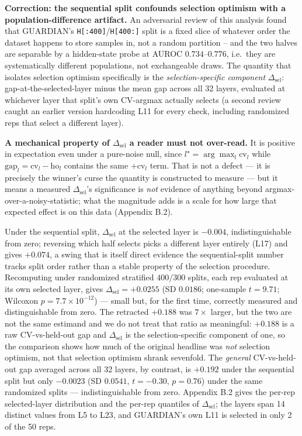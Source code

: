 \documentclass[10pt]{article} %
\begin{document}
\textbf{Correction: the sequential split confounds selection optimism with
a population-difference artifact.} An adversarial review of this analysis
found that GUARDIAN's \texttt{H[:400]}/\texttt{H[400:]} split is a fixed
slice of whatever order the dataset happens to store samples in, not a
random partition -- and the two halves are separable by a hidden-state
probe at AUROC $0.734$--$0.776$, i.e.\ they are systematically different
populations, not exchangeable draws. The quantity that isolates selection
optimism specifically is the \emph{selection-specific component}
$\Delta_{\text{sel}}$: gap-at-the-selected-layer minus the mean gap across all
32 layers, evaluated at whichever layer that split's own CV-argmax actually
selects (a second review caught an earlier version hardcoding L11 for every
check, including randomized reps that select a different layer).

\textbf{A mechanical property of $\Delta_{\text{sel}}$ a reader must not
over-read.} It is positive in expectation even under a pure-noise null, since
$l^\star=\arg\max_l\text{cv}_l$ while $\text{gap}_l=\text{cv}_l-\text{ho}_l$
contains the same $+\text{cv}_l$ term. That is not a defect --- it is precisely
the winner's curse the quantity is constructed to measure --- but it means a
measured $\Delta_{\text{sel}}$'s significance is \emph{not} evidence of
anything beyond argmax-over-a-noisy-statistic; what the magnitude adds is a
scale for how large that expected effect is on this data (Appendix B.2).

Under the sequential split, $\Delta_{\text{sel}}$ at the selected layer is
$-0.004$, indistinguishable from zero; reversing which half selects picks a
different layer entirely (L17) and gives $+0.074$, a swing that is itself
direct evidence the sequential-split number tracks split order rather than a
stable property of the selection procedure. Recomputing under randomized
stratified $400/300$ splits, each rep evaluated at its own selected layer,
gives $\Delta_{\text{sel}}=+0.0255$ (SD $0.0186$; one-sample $t=9.71$;
Wilcoxon $p=7.7\times10^{-12}$) --- small but, for the first time, correctly
measured and distinguishable from zero. The retracted $+0.188$ was
$7\times$ larger, but the two are not the same estimand and we do not treat
that ratio as meaningful: $+0.188$ is a raw CV-vs-held-out gap and
$\Delta_{\text{sel}}$ is the selection-specific component of one, so the
comparison shows how much of the original headline was \emph{not} selection
optimism, not that selection optimism shrank sevenfold. The \emph{general} CV-vs-held-out gap
averaged across all 32 layers, by contrast, is $+0.192$ under the sequential
split but only $-0.0023$ (SD $0.0541$, $t=-0.30$, $p=0.76$) under the same
randomized splits --- indistinguishable from zero. Appendix B.2 gives the
per-rep selected-layer distribution and the per-rep quantiles of
$\Delta_{\text{sel}}$; the layers span 14 distinct values from L5 to L23, and
GUARDIAN's own L11 is selected in only 2 of the 50 reps.
\end{document}
